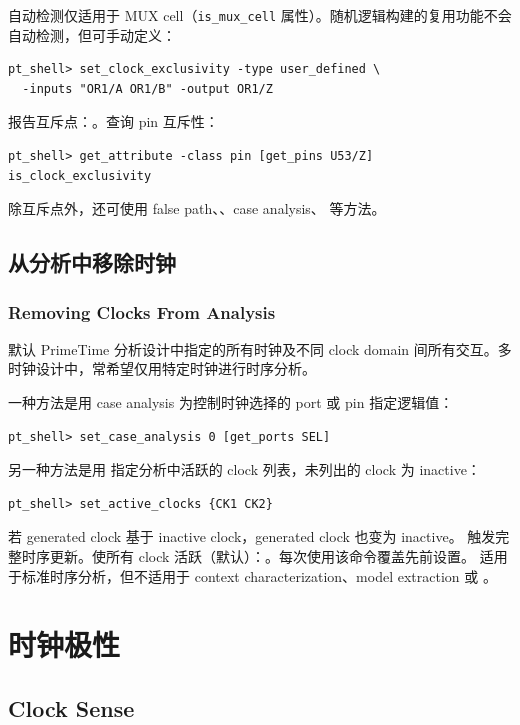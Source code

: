 自动检测仅适用于 MUX cell（\texttt{is\_mux\_cell} 属性）。随机逻辑构建的复用功能不会自动检测，但可手动定义：
\begin{lstlisting}
pt_shell> set_clock_exclusivity -type user_defined \
  -inputs "OR1/A OR1/B" -output OR1/Z
\end{lstlisting}

报告互斥点：。查询 pin 互斥性：
\begin{lstlisting}
pt_shell> get_attribute -class pin [get_pins U53/Z] is_clock_exclusivity
\end{lstlisting}

除互斥点外，还可使用 false path、、case analysis、 等方法。

\subsection{从分析中移除时钟}
\subsubsection*{Removing Clocks From Analysis}

默认 PrimeTime 分析设计中指定的所有时钟及不同 clock domain 间所有交互。多时钟设计中，常希望仅用特定时钟进行时序分析。

一种方法是用 case analysis 为控制时钟选择的 port 或 pin 指定逻辑值：
\begin{lstlisting}
pt_shell> set_case_analysis 0 [get_ports SEL]
\end{lstlisting}

另一种方法是用  指定分析中活跃的 clock 列表，未列出的 clock 为 inactive：
\begin{lstlisting}
pt_shell> set_active_clocks {CK1 CK2}
\end{lstlisting}

若 generated clock 基于 inactive clock，generated clock 也变为 inactive。 触发完整时序更新。使所有 clock 活跃（默认）：。每次使用该命令覆盖先前设置。 适用于标准时序分析，但不适用于 context characterization、model extraction 或 。


\section{时钟极性}
\subsection*{Clock Sense}

